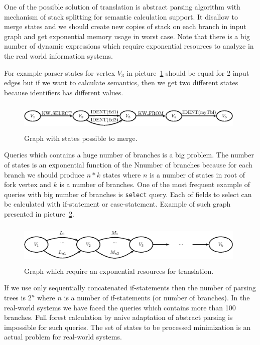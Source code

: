 \documentclass{llncs}
\begin{document}
One of the possible solution of translation is abstract parsing algorithm with mechanism of stack 
splitting for semantic calculation support. It disallow to merge states and we should create new 
copies of stack on each branch in input graph and get exponential memory usage in worst case. 
Note that there is a big number of dynamic expressions which require exponential resources to 
analyze in the real world information systems. 

For example parser states for vertex $V_3$ in picture~\ref{pic4} should be equal for 2 input edges
but if we want to calculate semantics, then we get two different states because identifiers has 
different values.

\begin{figure}
    \begin{center}
        \includegraphics[width=11cm,height=1.4cm]{graphs/states_example.eps}
        \caption{Graph with states possible to merge.}
        \label{pic4}
    \end{center}
\end{figure}

Queries which contains a huge number of branches is a big problem. The number of states is an 
exponential function of the Nnumber of branches because for each branch we should produce $n*k$ 
states where $n$ is a number of states in root of fork vertex and $k$ is a number of branches. 
One of the most frequent example of queries with big number of branches is \verb|select| query. 
Each of fields to select can be calculated with if-statement or case-statement. Example of such 
graph presented in picture~\ref{pic5}.

\begin{figure}
    \begin{center}
        \includegraphics[width=11cm,height=2cm]{graphs/big_res.eps}
        \caption{Graph which require an exponential resources for translation.}
        \label{pic5}
    \end{center}
\end{figure}

If we use only sequentially concatenated if-statements then the number of parsing trees is $2^n$ 
where $n$ is a number of if-statements (or number of branches). In the real-world systems we 
have faced the queries which contains more than 100 branches. Full forest calculation by naive 
adaptation of abstract parsing is impossible for such queries. The set of states to be processed
 minimization is an actual problem for real-world systems.
\end{document}
